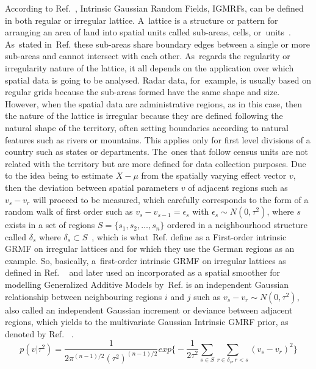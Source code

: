 \documentclass[energies,article,accept,pdftex,moreauthors]{Definitions/mdpi}
\begin{document}
    According to Ref.~\citep{Rue2005GaussianApplications}, Intrinsic Gaussian Random Fields, IGMRFs, can be defined in both regular or irregular lattice. A~lattice is a structure or pattern for arranging an area of land into spatial units called sub-areas, cells, or~units~\citep{Saveliev2007AnalysisData}. As~stated in~Ref. \citep{Saveliev2007AnalysisData} these sub-areas share boundary edges between a single or more sub-areas and cannot intersect with  each other. As~regards the regularity or irregularity nature of the lattice, it all depends on the application over which spatial data is going to be analysed. Radar data, for~example, is usually based on regular grids because the sub-areas formed have the same shape and size. However, when the spatial data are administrative regions, as in this case, then the nature of the lattice is irregular because they are defined following the natural shape of the territory, often setting boundaries according to natural features such as rivers or mountains. This applies only for first level divisions of a country such as states or departments. The~ones that follow census units are not related with the territory but are more defined for data collection purposes. Due to the idea being to estimate $X-\mu$ from the spatially varying effect vector $v$, then the deviation between spatial parameters $v$ of adjacent regions such as \(v_s-v_r\) will proceed to be measured, which carefully corresponds to the form of a random walk of first order such as \(v_s-v_{s-1}=\epsilon_s\) with \(\epsilon_s \sim N(0,\tau^2)\), where $s$ exists in a set of regions \(S=\{s_1,s_2,…,s_n\}\) ordered in a neighbourhood structure called $\delta_s$ where \(\delta_s \subset S\)~\citep{Fahrmeir2011BayesianData}, which is what~Ref. \citep{Rue2005GaussianApplications} define as a First-order intrinsic GRMF on irregular lattices and for which they use the German regions as an example. So, basically, a~first-order intrinsic GRMF on irregular lattices as defined in Ref. ~\citep{Rue2005GaussianApplications} and later used an incorporated as a spatial smoother for modelling Generalized Additive Models by~Ref. \citep{Fahrmeir2011BayesianData,Wood2017GeneralizedR} is an independent Gaussian relationship between neighbouring regions $i$ and $j$ such as  \(v_s-v_r \sim N(0,\tau^2)\), also called an independent Gaussian increment or deviance between adjacent regions, which yields to the multivariate Gaussian Intrinsic GMRF prior, as denoted by Ref. ~\citep{Fahrmeir2011BayesianData}.
\begin{equation}\label{eq:23}
        p(v\vert\tau^2)=\frac{1}{2\pi^{(n-1)/2}(\tau^2)^{(n-1)/2} }exp\big\{ -\frac{1}{2\tau^2} \sum_{s \in S} \sum_{r \in \delta_s,r<s} (v_s-v_r)^2  \big\}
    \end{equation}
    
\end{document}
